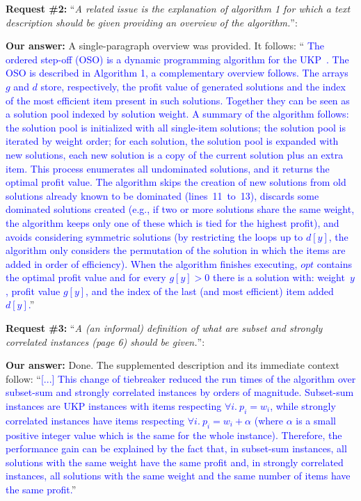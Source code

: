 \documentclass{elsarticle}
\begin{document}
\textbf{Request \#2:} ``\textit{A related issue is the explanation of algorithm 1 for which a text description should be given providing an overview of the algorithm.}'':

\textbf{Our answer:} A single-paragraph overview was provided. It follows: ``\textcolor{blue}{
The ordered step-off (OSO) is a dynamic programming algorithm for the UKP~\citep{gg-66}.
The OSO is described in Algorithm 1, a complementary overview follows.
The arrays \(g\) and \(d\) store, respectively, the profit value of generated solutions and the index of the most efficient item present in such solutions.
Together they can be seen as a solution pool indexed by solution weight.
A summary of the algorithm follows: the solution pool is initialized with all single-item solutions; the solution pool is iterated by weight order; for each solution, the solution pool is expanded with new solutions, each new solution is a copy of the current solution plus an extra item.
This process enumerates all undominated solutions, and it returns the optimal profit value.
The algorithm skips the creation of new solutions from old solutions already known to be dominated (lines~11~to~13), discards some dominated solutions created (e.g., if two or more solutions share the same weight, the algorithm keeps only one of these which is tied for the highest profit), and avoids considering symmetric solutions (by restricting the loops up to \(d[y]\), the algorithm only considers the permutation of the solution in which the items are added in order of efficiency).
When the algorithm finishes executing, \(opt\) contains the optimal profit value and for every \(g[y] > 0\) there is a solution with: weight~\(y\), profit value \(g[y]\), and the index of the last (and most efficient) item added~\(d[y]\).}''
\bigskip

\textbf{Request \#3:} ``\textit{A (an informal) definition of what are subset and strongly correlated instances (page 6) should be given.}'':

\textbf{Our answer:} Done. The supplemented description and its immediate context follow: ``\textcolor{blue}{[...] This change of tiebreaker reduced the run times of the algorithm over subset-sum and strongly correlated instances by orders of magnitude. Subset-sum instances are UKP instances with items respecting \(\forall i.~p_i = w_i\), while strongly correlated instances have items respecting \(\forall i.~p_i = w_i + \alpha\) (where \(\alpha\) is a small positive integer value which is the same for the whole instance). Therefore, the performance gain can be explained by the fact that, in subset-sum instances, all solutions with the same weight have the same profit and, in strongly correlated instances, all solutions with the same weight and the same number of items have the same profit.}''
\bigskip
\end{document}
